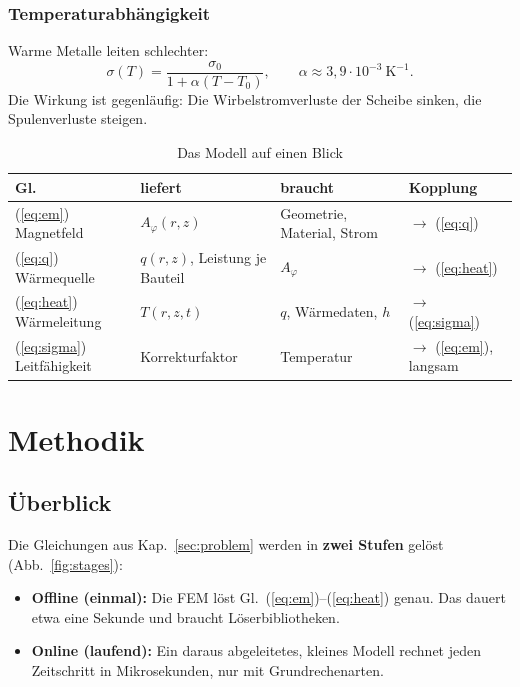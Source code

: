 \documentclass[a4paper, 10pt, conference]{ieeeconf}
\begin{document}
\subsubsection{Temperaturabhängigkeit}
Warme Metalle leiten schlechter:
\begin{equation}
\sigma(T) = \frac{\sigma_0}{1+\alpha (T-T_0)},\qquad
\alpha \approx 3{,}9\cdot10^{-3}\ \mathrm{K^{-1}}.
\label{eq:sigma}
\end{equation}
Die Wirkung ist gegenläufig: Die Wirbelstromverluste der Scheibe sinken, die
Spulenverluste steigen.

\begin{table}[t]
\caption{Das Modell auf einen Blick}
\label{tab:model}
\centering\footnotesize
\begin{tabularx}{\columnwidth}{@{}lYYY@{}}
\toprule
Gl. & liefert & braucht & Kopplung \\
\midrule
(\ref{eq:em}) Magnetfeld & $A_\varphi(r,z)$ & Geometrie, Material, Strom & $\rightarrow$ (\ref{eq:q}) \\
(\ref{eq:q}) Wärmequelle & $q(r,z)$, Leistung je Bauteil & $A_\varphi$ & $\rightarrow$ (\ref{eq:heat}) \\
(\ref{eq:heat}) Wärmeleitung & $T(r,z,t)$ & $q$, Wärmedaten, $h$ & $\rightarrow$ (\ref{eq:sigma}) \\
(\ref{eq:sigma}) Leitfähigkeit & Korrekturfaktor & Temperatur & $\rightarrow$ (\ref{eq:em}), langsam \\
\bottomrule
\end{tabularx}
\end{table}

\section{Methodik}
\label{sec:method}

\subsection{Überblick}

Die Gleichungen aus Kap.~\ref{sec:problem} werden in \textbf{zwei Stufen}
gelöst (Abb.~\ref{fig:stages}):
\begin{itemize}[leftmargin=*]
  \item \textbf{Offline (einmal):} Die FEM löst
        Gl.~(\ref{eq:em})--(\ref{eq:heat}) genau. Das dauert etwa eine
        Sekunde und braucht Löserbibliotheken.
  \item \textbf{Online (laufend):} Ein daraus abgeleitetes, kleines Modell
        rechnet jeden Zeitschritt in Mikrosekunden, nur mit Grundrechenarten.
\end{itemize}
\end{document}
